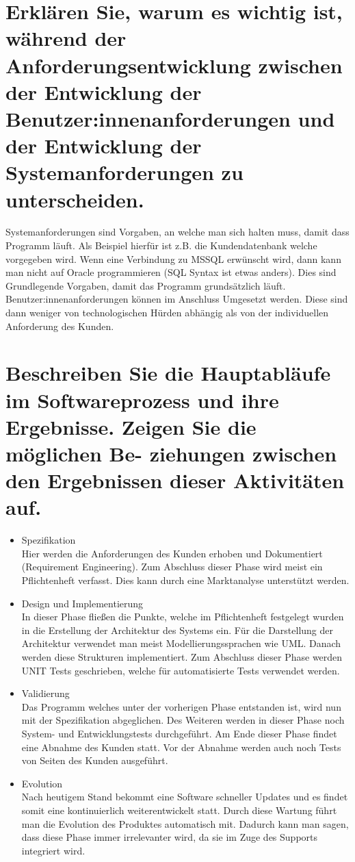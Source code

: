 \documentclass[12pt]{article}
\begin{document}
\section{Erklären Sie, warum es wichtig ist, während der Anforderungsentwicklung zwischen der Entwicklung der
Benutzer:innenanforderungen und der Entwicklung der Systemanforderungen zu unterscheiden.}
Systemanforderungen sind Vorgaben, an welche man sich halten muss, damit dass Programm läuft. Als Beispiel hierfür ist z.B. die Kundendatenbank welche vorgegeben wird. Wenn eine Verbindung zu MSSQL erwünscht wird, dann kann man nicht auf Oracle programmieren (SQL Syntax ist etwas anders). Dies sind Grundlegende Vorgaben, damit das Programm grundsätzlich läuft. Benutzer:innenanforderungen können im Anschluss Umgesetzt werden. Diese sind dann weniger von technologischen Hürden abhängig als von der individuellen Anforderung des Kunden.

\section{Beschreiben Sie die Hauptabläufe im Softwareprozess und ihre Ergebnisse. Zeigen Sie die möglichen Be-
ziehungen zwischen den Ergebnissen dieser Aktivitäten auf.}
\begin{itemize}
 \item Spezifikation\\
 Hier werden die Anforderungen des Kunden erhoben und Dokumentiert (Requirement Engineering). Zum Abschluss dieser Phase wird meist ein Pflichtenheft verfasst. Dies kann durch eine Marktanalyse unterstützt werden.
 \item Design und Implementierung\\
 In dieser Phase fließen die Punkte, welche im Pflichtenheft festgelegt wurden in die Erstellung der Architektur des Systems ein. Für die Darstellung der Architektur verwendet man meist Modellierungssprachen wie UML. Danach werden diese Strukturen implementiert. Zum Abschluss dieser Phase werden UNIT Tests geschrieben, welche für automatisierte Tests verwendet werden.
 \item Validierung\\
 Das Programm welches unter der vorherigen Phase entstanden ist, wird nun mit der Spezifikation abgeglichen. Des Weiteren werden in dieser Phase noch System- und Entwicklungstests durchgeführt. Am Ende dieser Phase findet eine Abnahme des Kunden statt. Vor der Abnahme werden auch noch Tests von Seiten des Kunden ausgeführt.
 \item Evolution\\
 Nach heutigem Stand bekommt eine Software schneller Updates und es findet somit eine kontinuierlich weiterentwickelt statt. Durch diese Wartung führt man die Evolution des Produktes automatisch mit. Dadurch kann man sagen, dass diese Phase immer irrelevanter wird, da sie im Zuge des Supports integriert wird.
\end{itemize}
\pagebreak
\end{document}
